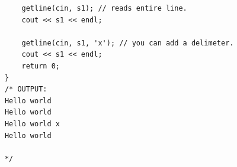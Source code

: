 \begin{itemize}
\begin{verbatim}
                getline(cin, s1); // reads entire line.
                cout << s1 << endl;

                getline(cin, s1, 'x'); // you can add a delimeter.
                cout << s1 << endl;
                return 0;
            }
            /* OUTPUT:
            Hello world
            Hello world
            Hello world x
            Hello world

            */
        \end{verbatim}
\end{itemize}
